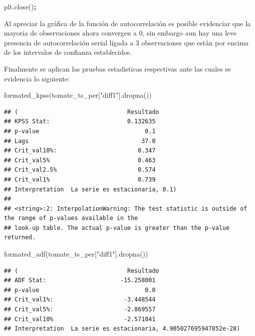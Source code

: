\documentclass[
]{book}
\newenvironment{Shaded}{\begin{snugshade}}{\end{snugshade}}
\newcommand{\NormalTok}[1]{#1}
\newcommand{\OperatorTok}[1]{\textcolor[rgb]{0.81,0.36,0.00}{\textbf{#1}}}
\newcommand{\StringTok}[1]{\textcolor[rgb]{0.31,0.60,0.02}{#1}}
\begin{document}
\begin{Shaded}
\begin{Highlighting}[]
\NormalTok{plt.close()}\OperatorTok{;}
\end{Highlighting}
\end{Shaded}

Al apreciar la gráfica de la función de autocorrelación es posible evidenciar que la mayoria de observaciones ahora convergen a 0, sin embargo aun hay una leve presencia de autocorrelación serial ligada a 3 observaciones que están por encima de los intervalos de confianza establecidos.

Finalmente se aplican las pruebas estadisticas respectivas ante las cuales se evidencia lo siguiente:

\begin{Shaded}
\begin{Highlighting}[]

\NormalTok{formated\_kpss(tomate\_ts\_per[}\StringTok{"diff1"}\NormalTok{].dropna())}
\end{Highlighting}
\end{Shaded}

\begin{verbatim}
## (                               Resultado
## KPSS Stat:                      0.132635
## p-value                              0.1
## Lags                                37.0
## Crit_val10%:                       0.347
## Crit_val5%                         0.463
## Crit_val2.5%                       0.574
## Crit_val1%                         0.739
## Interpretation  La serie es estacionaria, 0.1)
## 
## <string>:2: InterpolationWarning: The test statistic is outside of the range of p-values available in the
## look-up table. The actual p-value is greater than the p-value returned.
\end{verbatim}

\begin{Shaded}
\begin{Highlighting}[]
\NormalTok{formated\_adf(tomate\_ts\_per[}\StringTok{"diff1"}\NormalTok{].dropna())}
\end{Highlighting}
\end{Shaded}

\begin{verbatim}
## (                               Resultado
## ADF Stat:                     -15.258001
## p-value                              0.0
## Crit_val1%:                    -3.448544
## Crit_val5%:                    -2.869557
## Crit_val10%                    -2.571041
## Interpretation  La serie es estacionaria, 4.905027695947852e-28)
\end{verbatim}
\end{document}
